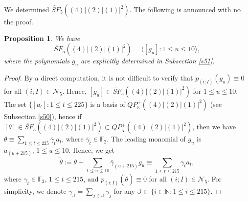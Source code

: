 \documentclass[reqno]{amsart}
\theoremstyle{plain}
\theoremstyle{definition}
\theoremstyle{plain}
\newtheorem{props}[thms]{Proposition}
\theoremstyle{definition}
\numberwithin{equation}{section}
\begin{document}
\smallskip
We determined $\widetilde{SF}_5{((4)|(2)|(1)|^2)}$. The following is announced \cite{suz} with no the proof.
\begin{props}\label{mdsp1} We have 
$$\widetilde{SF}_5{((4)|(2)|(1)|^2)} = \langle [g_u]: 1 \leqslant u \leqslant 10\rangle,$$
where the polynomials $g_u$ are explicitly determined in Subsection \ref{s51}.
\end{props}
\begin{proof} By a direct computation, it is not difficult to verify that $p_{(i;I)}(g_u) \equiv 0$ for all $(i;I)\in \mathcal N_5$. Hence, $[g_u] \in \widetilde{SF}_5{((4)|(2)|(1)|^2)}$ for $1 \leqslant u \leqslant 10$.
The set $\{[a_t] :1\leqslant t \leqslant 225\}$ is a basis of  $QP_5^+((4)|(2)|(1)|^2)$ (see Subsection \ref{s50}), hence if $[\theta] \in \widetilde {SF}_{5}((4)|(2)|(1)|^2)\subset QP_5^+((4)|(2)|(1)|^2)$, then we have $\theta \equiv \sum_{1\leqslant t \leqslant 225}\bar\gamma_ta_{t}$, where $\bar\gamma_t \in \mathbb F_2$. The leading monomial of $g_u$ is $a_{(u+215)},\, 1\leqslant u \leqslant 10$. Hence, we get 
\begin{equation}\label{ctd612}
\widetilde\theta := \theta + \sum_{1\leqslant u \leqslant 10}\bar\gamma_{(u+215)}g_u\equiv \sum_{1\leqslant t \leqslant 215}\gamma_ta_{t},
\end{equation}
where $\gamma_t \in \mathbb F_2$, $1\leqslant t \leqslant 215$, and $p_{(i;I)}(\widetilde\theta) \equiv 0$ for all $(i;I) \in \mathcal N_5$. For simplicity, we denote $\gamma_{\mathbb J} = \sum_{j \in \mathbb J}\gamma_j$ for any $\mathbb J \subset \{i\in \mathbb N:1\leqslant i \leqslant 215\}$.


\end{proof}
\end{document}
